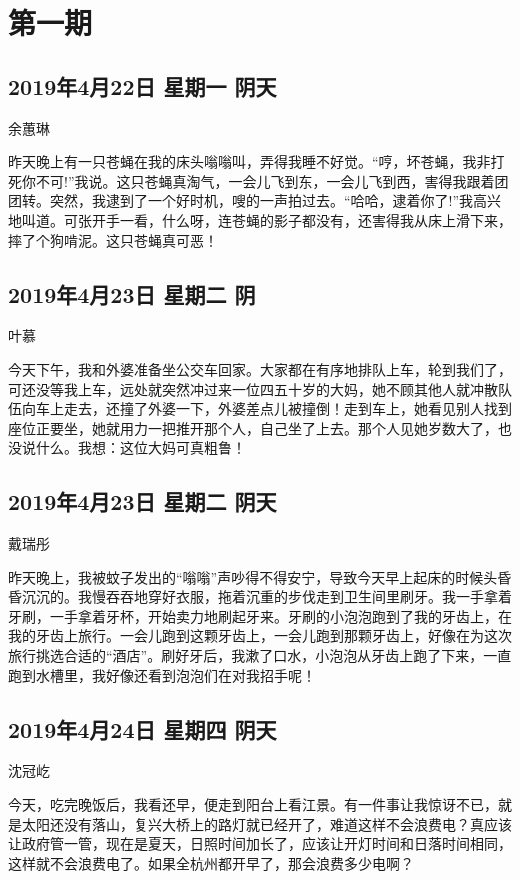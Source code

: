\chapter{第一期}

\section{2019年4月22日 星期一 阴天}

余蕙琳

昨天晚上有一只苍蝇在我的床头嗡嗡叫，弄得我睡不好觉。“哼，坏苍蝇，我非打死你不可!”我说。这只苍蝇真淘气，一会儿飞到东，一会儿飞到西，害得我跟着团团转。突然，我逮到了一个好时机，嗖的一声拍过去。“哈哈，逮着你了!”我高兴地叫道。可张开手一看，什么呀，连苍蝇的影子都没有，还害得我从床上滑下来，摔了个狗啃泥。这只苍蝇真可恶！

\section{2019年4月23日 星期二 阴}

叶慕

今天下午，我和外婆准备坐公交车回家。大家都在有序地排队上车，轮到我们了，可还没等我上车，远处就突然冲过来一位四五十岁的大妈，她不顾其他人就冲散队伍向车上走去，还撞了外婆一下，外婆差点儿被撞倒！走到车上，她看见别人找到座位正要坐，她就用力一把推开那个人，自己坐了上去。那个人见她岁数大了，也没说什么。我想：这位大妈可真粗鲁！

\section{2019年4月23日 星期二 阴天}

戴瑞彤

昨天晚上，我被蚊子发出的“嗡嗡”声吵得不得安宁，导致今天早上起床的时候头昏昏沉沉的。我慢吞吞地穿好衣服，拖着沉重的步伐走到卫生间里刷牙。我一手拿着牙刷，一手拿着牙杯，开始卖力地刷起牙来。牙刷的小泡泡跑到了我的牙齿上，在我的牙齿上旅行。一会儿跑到这颗牙齿上，一会儿跑到那颗牙齿上，好像在为这次旅行挑选合适的“酒店”。刷好牙后，我漱了口水，小泡泡从牙齿上跑了下来，一直跑到水槽里，我好像还看到泡泡们在对我招手呢！

\section{2019年4月24日 星期四 阴天}

沈冠屹

今天，吃完晚饭后，我看还早，便走到阳台上看江景。有一件事让我惊讶不已，就是太阳还没有落山，复兴大桥上的路灯就已经开了，难道这样不会浪费电？真应该让政府管一管，现在是夏天，日照时间加长了，应该让开灯时间和日落时间相同，这样就不会浪费电了。如果全杭州都开早了，那会浪费多少电啊？

